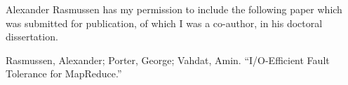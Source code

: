Alexander Rasmussen has my permission to include the following paper which was
submitted for publication, of which I was a co-author, in his doctoral
dissertation.

Rasmussen, Alexander; Porter, George; Vahdat, Amin. ``I/O-Efficient Fault
Tolerance for MapReduce.''

